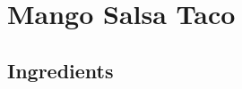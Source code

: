 \thispagestyle{fancy}
\section{Mango Salsa Taco}
\AddToShipoutPicture*{\MangoSalsaTaco}

\subsection*{Ingredients}